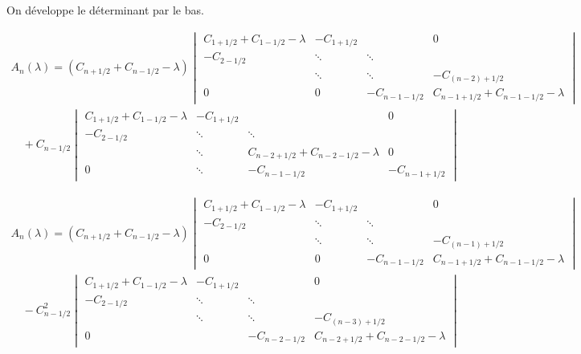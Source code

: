 \documentclass[a4paper,11pt]{article}
\theoremstyle{nonumberplain}
\begin{document}
On développe le déterminant par le bas.

\begin{equation*}
\begin{split}
A_n(\lambda) =
(C_{n + 1/2} + C_{n - 1/2} - \lambda)
\begin{vmatrix}
  C_{1 + 1/2} + C_{1 - 1/2} - \lambda & -C_{1 + 1/2} & & 0\\
  -C_{2 - 1/2} & \ddots & \ddots &  \\
  & \ddots & \ddots &  -C_{(n - 2) + 1/2} \\
  0 &  0 & -C_{n - 1 - 1/2} & C_{n - 1 + 1/2} + C_{n - 1 - 1/2} - \lambda
\end{vmatrix} \\
\quad
+C_{n - 1/2}
\begin{vmatrix}
  C_{1 + 1/2} + C_{1 - 1/2} - \lambda & -C_{1 + 1/2} & & 0\\
  -C_{2 - 1/2} & \ddots & \ddots &  \\
  & \ddots &  C_{n - 2 + 1/2} + C_{n - 2 - 1/2} - \lambda & 0 \\
  0 &  \ddots & -C_{n - 1 - 1/2} & -C_{n - 1 + 1/2}
\end{vmatrix}
\end{split}
\end{equation*}

  \begin{equation*}
  \begin{split}
  A_n(\lambda) =
  (C_{n + 1/2} + C_{n - 1/2} - \lambda)
  \begin{vmatrix}
    C_{1 + 1/2} + C_{1 - 1/2} - \lambda & -C_{1 + 1/2} & & 0\\
    -C_{2 - 1/2} & \ddots & \ddots &  \\
    & \ddots & \ddots &  -C_{(n - 1) + 1/2}\\
    0 &  0 & -C_{n - 1 - 1/2} & C_{n - 1 + 1/2} + C_{n - 1 - 1/2} - \lambda
  \end{vmatrix} \\
\quad
  -C_{n - 1/2}^{2}
\begin{vmatrix}
    C_{1 + 1/2} + C_{1 - 1/2} - \lambda & -C_{1 + 1/2} & & 0\\
    -C_{2 - 1/2} & \ddots & \ddots &  \\
    & \ddots & \ddots &  -C_{(n - 3) + 1/2} \\
    0 &  & -C_{n - 2 -1/2} & C_{n - 2 + 1/2} + C_{n - 2 - 1/2} - \lambda
  \end{vmatrix}
  \end{split}
\end{equation*}
\end{document}
